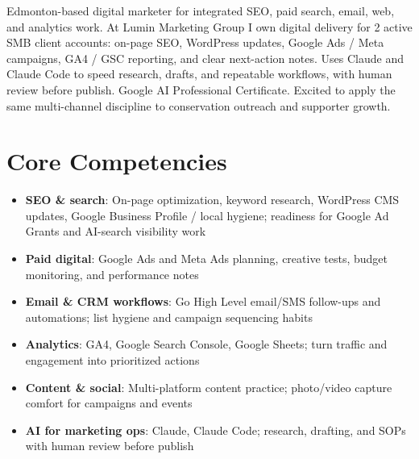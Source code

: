 \documentclass[11pt,a4paper,sans]{moderncv}
\begin{document}
\makecvtitle

\vspace{6pt}
\small{Edmonton-based digital marketer for integrated SEO, paid search, email, web, and analytics work. At Lumin Marketing Group I own digital delivery for 2 active SMB client accounts: on-page SEO, WordPress updates, Google Ads / Meta campaigns, GA4 / GSC reporting, and clear next-action notes. Uses Claude and Claude Code to speed research, drafts, and repeatable workflows, with human review before publish. Google AI Professional Certificate. Excited to apply the same multi-channel discipline to conservation outreach and supporter growth.}

\section{Core Competencies}
\vspace{1pt}
\begin{itemize}
\item \textbf{SEO \& search}: On-page optimization, keyword research, WordPress CMS updates, Google Business Profile / local hygiene; readiness for Google Ad Grants and AI-search visibility work
\item \textbf{Paid digital}: Google Ads and Meta Ads planning, creative tests, budget monitoring, and performance notes
\item \textbf{Email \& CRM workflows}: Go High Level email/SMS follow-ups and automations; list hygiene and campaign sequencing habits
\item \textbf{Analytics}: GA4, Google Search Console, Google Sheets; turn traffic and engagement into prioritized actions
\item \textbf{Content \& social}: Multi-platform content practice; photo/video capture comfort for campaigns and events
\item \textbf{AI for marketing ops}: Claude, Claude Code; research, drafting, and SOPs with human review before publish
\end{itemize}
\end{document}
